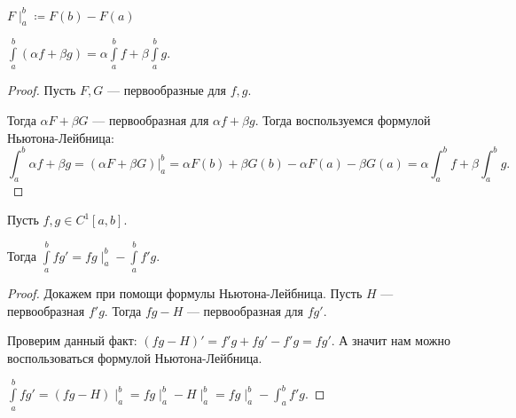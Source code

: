 \begin{definition}
    $F\mid_a^b \coloneqq F(b) - F(a)$
\end{definition}
\begin{theorem}
    $\int\limits_a^b(\alpha f + \beta g) = \alpha \int\limits_a^b f + \beta \int\limits_a^b g$.
\end{theorem}
\begin{proof}
    Пусть $F, G$ --- первообразные для  $f, g$.

    Тогда  $\alpha F + \beta G$ --- первообразная для  $\alpha f + \beta g$. Тогда воспользуемся формулой Ньютона-Лейбница:  \[
	    \int_a^b \alpha f + \beta g = \left.\left(\alpha F + \beta G\right)\right|_a^b = \alpha F(b) + \beta G(b) - \alpha F(a) - \beta G(a) = \alpha \int_a^b f + \beta \int_a^b g
    .\] 
\end{proof}
\begin{theorem}
    Пусть $f, g \in C^{1}[a, b]$.

    Тогда  $\int\limits_a^b fg' = fg \mid_a^b - \int\limits_a^bf'g$.
\end{theorem}
\begin{proof}
    Докажем при помощи формулы Ньютона-Лейбница. Пусть $H$ --- первообразная  $f'g$. Тогда  $fg - H$ --- первообразная для $fg'$.

    Проверим данный факт: $\left(fg - H\right)' = f'g + fg' - f'g = fg'$. А значит нам можно воспользоваться формулой Ньютона-Лейбница.

    $\int\limits_a^b fg' = \left(fg - H\right) \mid_a^b = fg \mid_a^b - H\mid_a^b = fg\mid_a^b - \int_a^b f'g$.
\end{proof}

